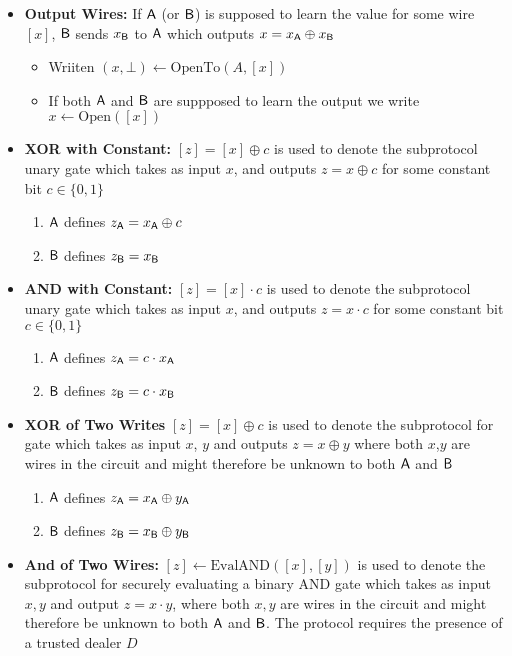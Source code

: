 \begin{itemize}
\begin{itemize}
    \end{itemize}
\item \textbf{Output Wires:} If $\mathsf{A}$ (or $\mathsf{B}$) is supposed to learn the value for some wire $[x]$, $\mathsf{B}$ sends $x_{\mathsf{B}}$ to $\mathsf{A}$ which outputs $x= x_{\mathsf{A}} \oplus x_{\mathsf{B}}$
    \begin{itemize}
        \item Wriiten $(x, \bot) \leftarrow \text{OpenTo}(A, [x])$
        \item If both $\mathsf{A}$ and $\mathsf{B}$ are suppposed to learn the output we write $x \leftarrow \text{Open}([x])$ 
    \end{itemize}
    \item \textbf{XOR with Constant:} $[z] = [x] \oplus c$ is used to denote the subprotocol unary gate which takes as input $x$, and outputs $z= x \oplus c$ for some constant bit $c \in \{0,1\}$
    \begin{enumerate}
        \item $\mathsf{A}$ defines $z_{\mathsf{A}} = x_{\mathsf{A}} \oplus c$
        \item $\mathsf{B}$ defines $z_{\mathsf{B}} = x_{\mathsf{B}}$
    \end{enumerate}
    \item \textbf{AND with Constant:} $[z] = [x] \cdot c$ is used to denote the subprotocol unary gate which takes as input $x$, and outputs $z= x \cdot c$ for some constant bit $c \in \{0,1\}$
    \begin{enumerate}
        \item $\mathsf{A}$ defines $z_{\mathsf{A}} = c \cdot x_{\mathsf{A}}$
        \item $\mathsf{B}$ defines $z_{\mathsf{B}} = c \cdot x_{\mathsf{B}}$
    \end{enumerate}
    \item \textbf{XOR of Two Writes} $[z] = [x] \oplus c$ is used to denote the subprotocol for gate which takes as input $x$, $y$ and outputs $z= x \oplus y$ where both $x$,$y$ are wires in the circuit and might therefore be unknown to both $\mathsf{A}$ and $\mathsf{B}$
    \begin{enumerate}
        \item $\mathsf{A}$ defines $z_{\mathsf{A}} = x_{\mathsf{A}} \oplus y_{\mathsf{A}}$
        \item $\mathsf{B}$ defines $z_{\mathsf{B}} = x_{\mathsf{B}} \oplus y_{\mathsf{B}}$
    \end{enumerate}
\item \textbf{And of Two Wires:} $[z] \leftarrow \text{EvalAND}([x], [y])$ is used to denote the subprotocol for securely evaluating a binary AND gate which takes as input $x,y$ and output $z=x \cdot y$, where both $x,y$ are wires in the circuit and might therefore be unknown to both $\mathsf{A}$ and $\mathsf{B}$. The protocol requires the presence of a trusted dealer $D$

\end{itemize}
